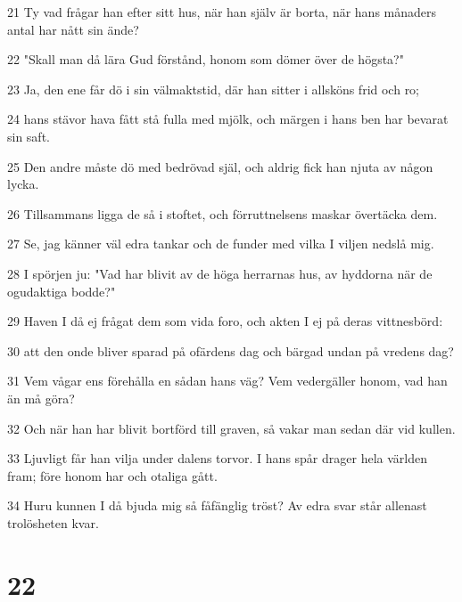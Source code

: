 \par 21 Ty vad frågar han efter sitt hus, när han själv är borta, när hans månaders antal har nått sin ände?
\par 22 "Skall man då lära Gud förstånd, honom som dömer över de högsta?"
\par 23 Ja, den ene får dö i sin välmaktstid, där han sitter i allsköns frid och ro;
\par 24 hans stävor hava fått stå fulla med mjölk, och märgen i hans ben har bevarat sin saft.
\par 25 Den andre måste dö med bedrövad själ, och aldrig fick han njuta av någon lycka.
\par 26 Tillsammans ligga de så i stoftet, och förruttnelsens maskar övertäcka dem.
\par 27 Se, jag känner väl edra tankar och de funder med vilka I viljen nedslå mig.
\par 28 I spörjen ju: "Vad har blivit av de höga herrarnas hus, av hyddorna när de ogudaktiga bodde?"
\par 29 Haven I då ej frågat dem som vida foro, och akten I ej på deras vittnesbörd:
\par 30 att den onde bliver sparad på ofärdens dag och bärgad undan på vredens dag?
\par 31 Vem vågar ens förehålla en sådan hans väg? Vem vedergäller honom, vad han än må göra?
\par 32 Och när han har blivit bortförd till graven, så vakar man sedan där vid kullen.
\par 33 Ljuvligt får han vilja under dalens torvor. I hans spår drager hela världen fram; före honom har och otaliga gått.
\par 34 Huru kunnen I då bjuda mig så fåfänglig tröst? Av edra svar står allenast trolösheten kvar.

\chapter{22}

